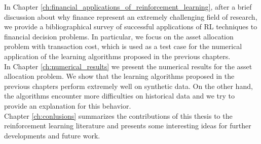 In Chapter \ref{ch:financial_applications_of_reinforcement_learning}, after a brief discussion about why finance represent an extremely challenging field of research, we provide a bibliographical survey of successful applications of RL techniques to financial decision problems. In particular, we focus on the asset allocation problem with transaction cost, which is used as a test case for the numerical application of the learning algorithms proposed in the previous chapters.\\
In Chapter \ref{ch:numerical_results} we present the numerical results for the asset allocation problem. We show that the learning algorithms proposed in the previous chapters perform extremely well on synthetic data. On the other hand, the algorithms encounter more difficulties on historical data and we try to provide an explanation for this behavior.\\
Chapter \ref{ch:conlusions} summarizes the contributions of this thesis to the reinforcement learning literature and presents some interesting ideas for further developments and future work.\\
 


